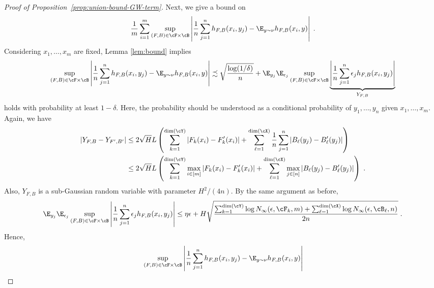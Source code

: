 \documentclass[11pt]{article}
\begin{document}
\begin{proof}[Proof of Proposition~\ref{prop:union-bound-GW-term}]
	Next, we give a bound on 
	\begin{equation*}
		\frac{1}{m} \sum_{i=1}^{m} \sup_{(F, B) \in \cF \times \cB} \left|\frac{1}{n} \sum_{j=1}^{n} h_{F, B}(x_i, y_j) - \E_{y \sim \nu} h_{F, B}(x_i, y)\right| \;.
	\end{equation*}
	Considering $x_1, \ldots, x_m$ are fixed, Lemma \ref{lem:bound} implies
	\begin{equation*}
		\begin{split}
			\sup_{(F, B) \in \cF \times \cB} \left|\frac{1}{n} \sum_{j=1}^{n} h_{F, B}(x_i, y_j) - \E_{y \sim \nu} h_{F, B}(x_i, y)\right|
			& \precsim \sqrt{\frac{\log(1 / \delta)}{n}} + \E_{y_j} \E_{\epsilon_j} \sup_{(F, B) \in \cF \times \cB} \underbrace{\left|\frac{1}{n} \sum_{j=1}^{n} \epsilon_j h_{F, B}(x_i, y_j) \right|}_{Y_{F, B}} \\
		\end{split}
	\end{equation*}
	holds with probability at least $1 - \delta$. Here, the probability should be understood as a conditional probability of $y_1, \ldots, y_n$ given $x_1, \ldots, x_m$. Again, we have
	\begin{equation*}
		\begin{split}
			|Y_{F, B} - Y_{F', B'}| 
			& \le
			2 \sqrt{H} L \left(\sum_{k = 1}^{\mathrm{dim}(\cY)} |F_k(x_i) - F_k'(x_i)| + \sum_{\ell = 1}^{\mathrm{dim}(\cX)} \frac{1}{n} \sum_{j = 1}^{n} |B_\ell(y_j) - B_\ell'(y_j)|\right) \\
			& \le
			2 \sqrt{H} L \left(\sum_{k = 1}^{\mathrm{dim}(\cY)} \max_{i \in [m]} |F_k(x_i) - F_k'(x_i)| + \sum_{\ell = 1}^{\mathrm{dim}(\cX)} \max_{j \in [n]} |B_\ell(y_j) - B_\ell'(y_j)|\right) \;.
		\end{split}
	\end{equation*}
	Also, $Y_{F, B}$ is a sub-Gaussian random variable with parameter $H^2 / (4 n)$. By the same argument as before, 
	\begin{equation*}
		\E_{y_j} \E_{\epsilon_j} \sup_{(F, B) \in \cF \times \cB} \left|\frac{1}{n} \sum_{j=1}^{n} \epsilon_j h_{F, B}(x_i, y_j) \right| \le \eta \epsilon +  H \sqrt{\frac{\sum_{k = 1}^{\mathrm{dim}(\cY)} \log N_{\infty}(\epsilon, \cF_k, m) + \sum_{\ell = 1}^{\mathrm{dim}(\cX)} \log N_{\infty}(\epsilon, \cB_\ell, n)}{2 n}} \;.
	\end{equation*}
	Hence, 
	\begin{equation*}
		\begin{split}
			& \sup_{(F, B) \in \cF \times \cB} \left|\frac{1}{n} \sum_{j=1}^{n} h_{F, B}(x_i, y_j) - \E_{y \sim \nu} h_{F, B}(x_i, y)\right| \\

\end{split}
\end{equation*}
\end{proof}
\end{document}
